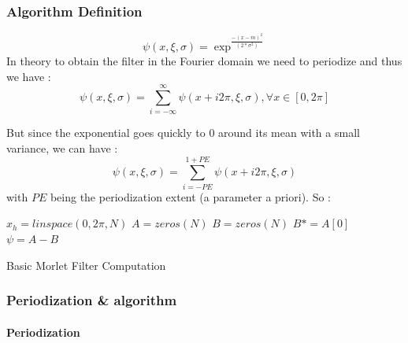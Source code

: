 \documentclass[a4paper]{report}
\begin{document}
\subsubsection*{Algorithm Definition}
\[
\psi (x,\xi,\sigma)=\exp^{\frac{-(x-m)^2}{(2*\sigma^2)} }
\]
In theory to obtain the filter in the Fourier domain we need to periodize and thus we have :
\[
\psi (x,\xi,\sigma)=\sum_{i=-\infty}^\infty \psi(x+i2\pi,\xi,\sigma), \forall x \in [0,2\pi]
\]

But since the exponential goes quickly to $0$ around its mean with a small variance, we can have :
\[
\psi (x,\xi,\sigma)=\sum_{i=-PE}^{1+PE} \psi(x+i2\pi,\xi,\sigma)
\]
with $PE$ being the periodization extent (a parameter a priori).
So :

\begin{algorithm}[H]
 \KwData{$\xi$, $\sigma$}
 \KwResult{$\psi$}
 $x_h=linspace(0,2\pi,N)$\;
 $A=zeros(N)$\;
 $B=zeros(N)$\;
  $B*=A[0]$
  $\psi= A-B$
 \caption{Basic Morlet Filter Computation}
\end{algorithm}
\subsubsection{Periodization \& algorithm }
\paragraph{Periodization}
\end{document}
